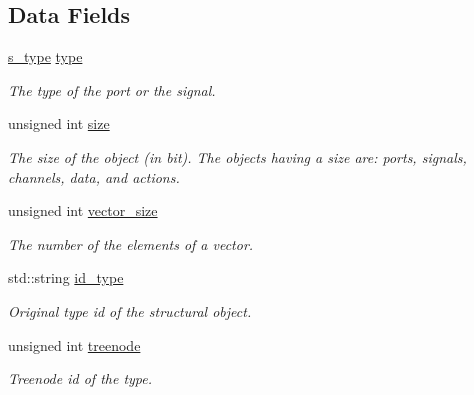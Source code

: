 \subsection*{Data Fields}
\begin{DoxyCompactItemize}
\item 
\hyperlink{structstructural__type__descriptor_ae12552f84c02a972c2a084901b94cd13}{s\+\_\+type} \hyperlink{structstructural__type__descriptor_ac7e81a7cabebeaf41e948a721da11854}{type}
\begin{DoxyCompactList}\small\item\em The type of the port or the signal. \end{DoxyCompactList}\item 
unsigned int \hyperlink{structstructural__type__descriptor_ac6575b2a1c6a9ee440a58eca5dca2c96}{size}
\begin{DoxyCompactList}\small\item\em The size of the object (in bit). The objects having a size are\+: ports, signals, channels, data, and actions. \end{DoxyCompactList}\item 
unsigned int \hyperlink{structstructural__type__descriptor_a3aa244ccc46c370865016f332e3dddcb}{vector\+\_\+size}
\begin{DoxyCompactList}\small\item\em The number of the elements of a vector. \end{DoxyCompactList}\item 
std\+::string \hyperlink{structstructural__type__descriptor_a4e0ad862dabda64db2dd30a88411fae0}{id\+\_\+type}
\begin{DoxyCompactList}\small\item\em Original type id of the structural object. \end{DoxyCompactList}\item 
unsigned int \hyperlink{structstructural__type__descriptor_a56d70456343951df87db074dbe969f87}{treenode}
\begin{DoxyCompactList}\small\item\em Treenode id of the type. \end{DoxyCompactList}\end{DoxyCompactItemize}
